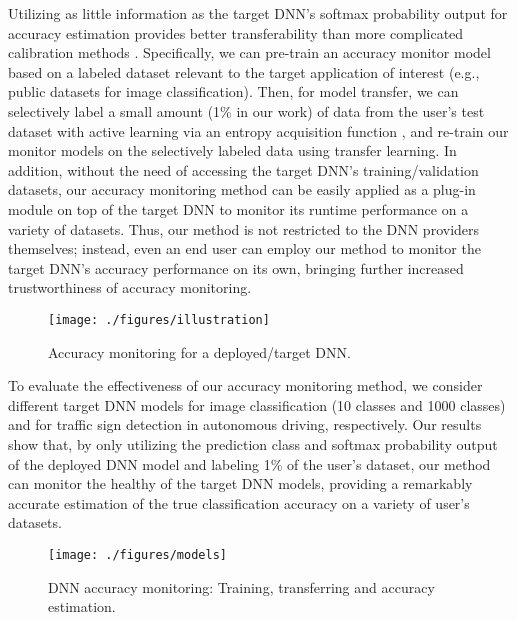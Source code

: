 \documentclass{article}
\begin{document}
Utilizing as little information as the target DNN's softmax probability output for accuracy estimation provides better transferability than
more complicated calibration methods \cite{DNN_Uncertainty_PostHoc_Dirichlet_NIPS_2019_kull2019beyond}.
Specifically, we can pre-train an accuracy monitor model based on
a labeled dataset relevant to the target application of interest
(e.g., public datasets for image classification).
Then, for model transfer, we can
selectively label a small amount (1\% in our work)
of data from the user's test dataset with active learning via
an  entropy acquisition function \cite{ensemble_active_learning_2018},
and re-train our monitor models
on the selectively labeled data using transfer learning.
In addition,
without the need
of accessing the target DNN's training/validation datasets,
our accuracy monitoring method
can be easily applied
as a plug-in module on top of the target DNN
to monitor its runtime performance on a variety
of datasets. Thus, our method is not restricted
to the DNN providers themselves; instead, even
an end user can employ our method to monitor
the target DNN's accuracy performance on its own, bringing
 further increased trustworthiness of accuracy
monitoring.

\begin{figure}[!t]
	\centering
	\texttt{[image: ./figures/illustration]}
	\vspace{-0.3cm}
	\caption{Accuracy monitoring for a deployed/target DNN.}\label{fig:illustration}
	\vspace{-0.3cm}
\end{figure}

To evaluate the effectiveness of our accuracy monitoring method,
we consider different target DNN models for
image classification (10 classes and 1000 classes)
and for traffic sign detection in autonomous driving, respectively.
Our results show that, by only utilizing the prediction class and softmax probability output of the deployed DNN model and labeling 1\% of the user's dataset, our method can monitor the healthy of the target DNN models, providing a remarkably accurate estimation of the true classification accuracy on a variety of user's datasets.
 \begin{figure*}[!t]
	\centering
	\texttt{[image: ./figures/models]}
	\vspace{-0.2cm}
	\caption{DNN accuracy monitoring: {Training}, transferring and accuracy estimation.}\label{fig:monitor_system_overview}
	\vspace{-0.2cm}
\end{figure*}
\end{document}
